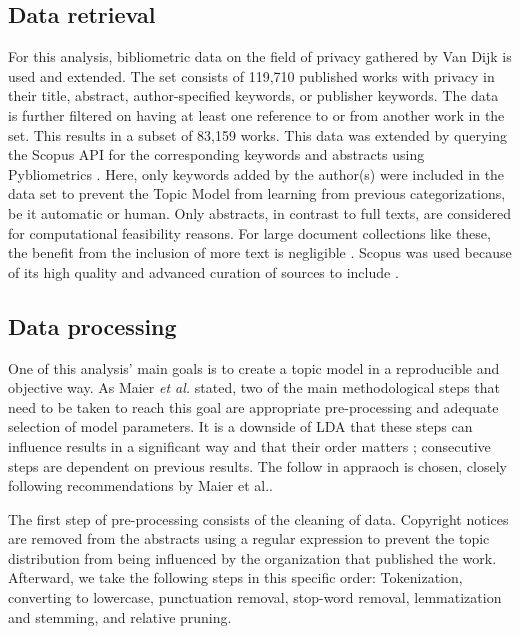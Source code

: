 \documentclass[runningheads]{llncs}
\begin{document}
\subsection{Data retrieval}
\label{retrieval}
For this analysis, bibliometric data on the field of privacy gathered by Van Dijk \cite{van_dijk_pillars_nodate} is used and extended. The set consists of 119,710 published works with privacy in their title, abstract, author-specified keywords, or publisher keywords. The data is further filtered on having at least one reference to or from another work in the set. This results in a subset of 83,159 works. This data was extended by querying the Scopus API for the corresponding keywords and abstracts using Pybliometrics \cite{rose2019pybliometrics}. Here, only keywords added by the author(s) were included in the data set to prevent the Topic Model from learning from previous categorizations, be it automatic or human. Only abstracts, in contrast to full texts, are considered for computational feasibility reasons. For large document collections like these, the benefit from the inclusion of more text is negligible \cite{syed_full-text_2017}. Scopus was used because of its high quality and advanced curation of sources to include \cite{baas2020scopus}.

\subsection{Data processing}
\label{processing}
One of this analysis’ main goals is to create a topic model in a reproducible and objective way. As Maier \textit{et al.} \cite{maier_applying_2018} stated, two of the main methodological steps that need to be taken to reach this goal are appropriate pre-processing and adequate selection of model parameters. It is a downside of LDA that these steps can influence results in a significant way and that their order matters \cite{denny2018text}; consecutive steps are dependent on previous results. The follow in appraoch is chosen, closely following recommendations by Maier et al.. 

The first step of pre-processing consists of the cleaning of data. Copyright notices are removed from the abstracts using a regular expression to prevent the topic distribution from being influenced by the organization that published the work. Afterward, we take the following steps in this specific order: Tokenization, converting to lowercase, punctuation removal, stop-word removal, lemmatization and stemming, and relative pruning. 
\end{document}
